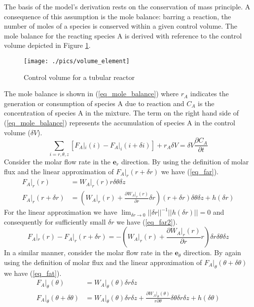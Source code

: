 \documentclass[11pt,fleqn]{article}
\theoremstyle{defstyle}
\begin{document}
The basis of the model's derivation rests on the conservation of mass principle. A consequence of this assumption is the mole balance: barring a reaction, the number of moles of a species is conserved within a given control volume. The mole balance for the reacting species A is derived with reference to the control volume depicted in Figure \ref{fig_vol_element}.

\begin{figure}[H] 
\centering
\texttt{[image: ./pics/volume\_element]}
\caption{Control volume for a tubular reactor} 
\label{fig_vol_element}
\end{figure}

The mole balance is shown in (\ref{eq_mole_balance}) where $r_A$ indicates the generation or consumption of species A due to reaction and $C_A$ is the concentration of species A in the mixture. The term on the right hand side of (\ref{eq_mole_balance}) represents the accumulation of species A in the control volume ($\delta V$).
\begin{equation}
\sum_{i=r, \theta, z}[F_A|_i(i) - F_A|_i(i+\delta i)] + r_A \delta V = \delta V \frac{\partial C_A}{\partial t}
\label{eq_mole_balance}
\end{equation}
Consider the molar flow rate in the $\mathbf{e}_r$ direction. By using the definition of molar flux and the linear approximation of $F_A|_r(r+\delta r)$ we have (\ref{eq_far}).
\begin{equation}
\begin{aligned}
F_A|_r(r) &= W_A|_r(r) r \delta \theta \delta z \\
F_A|_r(r+\delta r) &= (W_ A|_r(r) + \frac{\partial W_A|_r(r)}{\partial r} \delta r)(r+\delta r)\delta \theta \delta z + h(\delta r)
\end{aligned}
\label{eq_far}
\end{equation}
For the linear approximation we have $\lim_{\delta r \to 0} ||\delta r||^{-1}||h(\delta r)|| = 0 $ and consequently for sufficiently small $\delta r$ we have (\ref{eq_far2}).  
\begin{equation}
F_A|_r(r) - F_A|_r(r+\delta r)  = - (W_ A|_r(r)  + \frac{\partial W_A|_r(r)}{\partial r}r) \delta r \delta \theta \delta z
\label{eq_far2}
\end{equation}
In a similar manner, consider the molar flow rate in the $\mathbf{e}_\theta$ direction. By again using the definition of molar flux and the linear approximation of $F_A|_\theta(\theta+\delta \theta)$ we have (\ref{eq_fat}).
\begin{equation}
\begin{aligned}
F_A|_\theta(\theta) &= W_A|_\theta(\theta) \delta r \delta z \\
F_A|_\theta(\theta + \delta \theta) &= W_A|_\theta(\theta) \delta r \delta z + \frac{\partial W_A|_\theta(\theta)}{r \partial \theta}\delta \theta\delta r \delta z + h(\delta \theta)
\end{aligned}
\label{eq_fat}
\end{equation}
\end{document}
